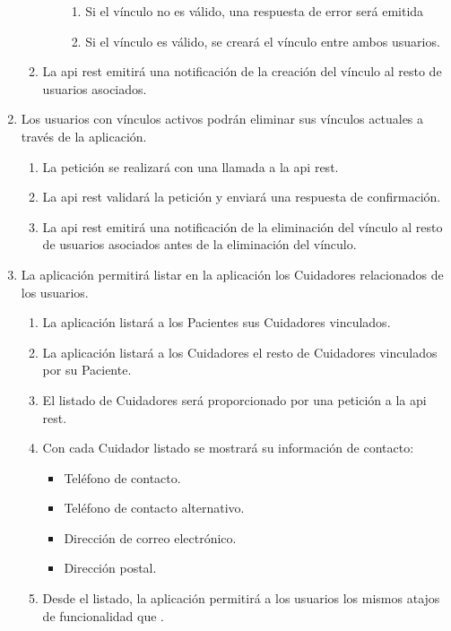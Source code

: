 \begin{enumerate}[label*=RGU \arabic*.]
\begin{enumerate}[label*=\arabic*.]
\begin{enumerate}[label*=\arabic*.]
\begin{enumerate}[label*=\arabic*.]
                \item Si el vínculo no es válido, una respuesta de error será emitida
                \item Si el vínculo es válido, se creará el vínculo entre ambos usuarios.
            \end{enumerate}
        \end{enumerate}
        \item \label{req:noti_nuevo_vinculo} La \acrshort{api} \acrshort{rest} emitirá una notificación de la creación del vínculo al resto de usuarios asociados.
    \end{enumerate}
    \item \label{req:borrar_vinculo} Los usuarios con vínculos activos podrán eliminar sus vínculos actuales a través de la aplicación.
    \begin{enumerate}[label*=\arabic*.]
        \item La petición se realizará con una llamada a la \acrshort{api} \acrshort{rest}.
        \item La \acrshort{api} \acrshort{rest} validará la petición y enviará una respuesta de confirmación.
        \item La \acrshort{api} \acrshort{rest} emitirá una notificación de la eliminación del vínculo al resto de usuarios asociados antes de la eliminación del vínculo.
    \end{enumerate}
    \item \label{req:consultar_info_cuidador} La aplicación permitirá listar en la aplicación los Cuidadores relacionados de los usuarios.
    \begin{enumerate}[label*=\arabic*.]
        \item La aplicación listará a los Pacientes sus Cuidadores vinculados.
        \item La aplicación listará a los Cuidadores el resto de Cuidadores vinculados por su Paciente.
        \item El listado de Cuidadores será proporcionado por una petición a la \acrshort{api} \acrshort{rest}.
        \item Con cada Cuidador listado se mostrará su información de contacto:
        \begin{itemize}
            \item Teléfono de contacto.
            \item Teléfono de contacto alternativo.
            \item Dirección de correo electrónico.
            \item Dirección postal.
        \end{itemize}
        \item Desde el listado, la aplicación permitirá a los usuarios los mismos atajos de funcionalidad que .
    \end{enumerate}
\end{enumerate}

